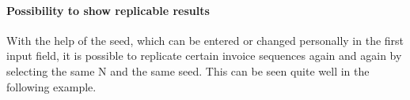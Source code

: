\paragraph{Possibility to show replicable results}
With the help of the seed, which can be entered or changed personally in the first input field, it is possible to replicate certain invoice sequences again and again by selecting the same N and the same seed. This can be seen quite well in the following example.
%
\begin{listing}
\end{listing}

